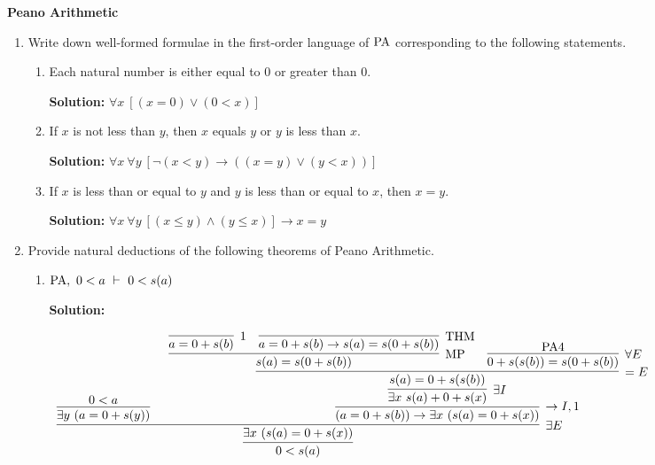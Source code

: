 \documentclass[11pt]{report}
\begin{document}
\begin{center}
	{\bf Peano Arithmetic}
\end{center}

\begin{enumerate}

	\item Write down well-formed formulae in the first-order language of $\text{PA}$ corresponding to the following statements. 
	
		\begin{enumerate}
			\item Each natural number is either equal to $0$ or greater than $0$.
			
				{\bf Solution:} $\forall x \ [(x = 0) \lor (0 < x)]$

			\item If $x$ is not less than $y$, then $x$ equals $y$ or $y$ is less than $x$.
			
				{\bf Solution:} $\forall x \ \forall y \ [\lnot(x<y) \to ((x=y) \lor (y<x))]$

			\item If $x$ is less than or equal to $y$ and $y$ is less than or equal to $x$, then $x=y$.
			
				{\bf Solution:} $\forall x \ \forall y \ [(x\leq y) \land (y\leq x)] \to x=y$ 

		\end{enumerate}
	 
	\item Provide natural deductions of the following theorems of Peano Arithmetic.
	
		\begin{enumerate}
			\item $\text{PA} , \ 0 < a \ \vdash \ 0 < s(a)$

				{\bf Solution:} 

				\begin{center}
					\footnotesize{$\begin{array}{c}
						\infer[]{0 < s(a)}
							{\infer[\exists E]{\exists x \ (s(a) = 0 + s(x))}
								{\infer[]{\exists y \ (a = 0 + s(y))}	
									{0 < a}
									&
								\infer[\to I,1]{(a = 0 + s(b)) \to \exists x \ (s(a) = 0 + s(x))}
									{\infer[\exists I]{\exists x \ s(a) + 0 + s(x)}
										{\infer[=E]{s(a) = 0 + s(s(b))}
											{\infer[\MP]{s(a) = s(0 + s(b))}
												{\infer[1]{a = 0 + s(b)}{}
													&
												\infer[\THM]{a = 0 + s(b) \to s(a) = s(0 + s(b))}{}}
												&
											\infer[\forall E]{0 + s(s(b)) = s(0 + s(b))}
												{\PA 4}}}}}}
					\end{array}$}
				\end{center}


\end{enumerate}
\end{enumerate}
\end{document}
